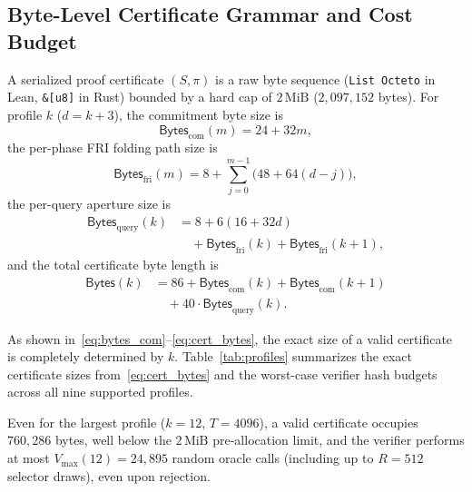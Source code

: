 \documentclass[conference]{IEEEtran}
\theoremstyle{definition}
\begin{document}
\subsection{Byte-Level Certificate Grammar and Cost Budget}
A serialized proof certificate $(S, \pi)$ is a raw byte sequence (\texttt{List Octeto} in Lean, \texttt{\&[u8]} in Rust) bounded by a hard cap of $2\,\text{MiB}$ ($2{,}097{,}152$ bytes). For profile $k$ ($d = k + 3$), the commitment byte size is
\begin{equation}
\label{eq:bytes_com}
\mathsf{Bytes}_{\text{com}}(m) = 24 + 32m,
\end{equation}
the per-phase FRI folding path size is
\begin{equation}
\label{eq:bytes_fri}
\mathsf{Bytes}_{\text{fri}}(m) = 8 + \sum_{j=0}^{m-1} \bigl(48 + 64(d - j)\bigr),
\end{equation}
the per-query aperture size is
\begin{equation}
\label{eq:bytes_query}
\begin{aligned}
\mathsf{Bytes}_{\text{query}}(k) &= 8 + 6(16 + 32d) \\
&\quad + \mathsf{Bytes}_{\text{fri}}(k) + \mathsf{Bytes}_{\text{fri}}(k+1),
\end{aligned}
\end{equation}
and the total certificate byte length is
\begin{equation}
\label{eq:cert_bytes}
\begin{aligned}
\mathsf{Bytes}(k) &= 86 + \mathsf{Bytes}_{\text{com}}(k) + \mathsf{Bytes}_{\text{com}}(k+1) \\
&\quad + 40 \cdot \mathsf{Bytes}_{\text{query}}(k).
\end{aligned}
\end{equation}

As shown in~\eqref{eq:bytes_com}--\eqref{eq:cert_bytes}, the exact size of a valid certificate is completely determined by $k$. Table~\ref{tab:profiles} summarizes the exact certificate sizes from~\eqref{eq:cert_bytes} and the worst-case verifier hash budgets across all nine supported profiles.

Even for the largest profile ($k = 12$, $T = 4096$), a valid certificate occupies $760{,}286$ bytes, well below the $2\,\text{MiB}$ pre-allocation limit, and the verifier performs at most $V_{\max}(12) = 24{,}895$ random oracle calls (including up to $R = 512$ selector draws), even upon rejection.
\end{document}
